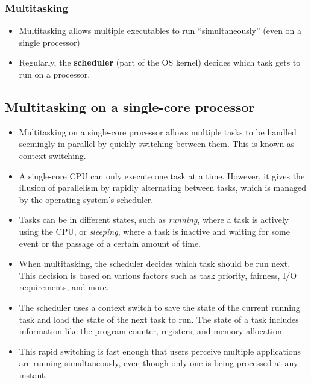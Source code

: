 \documentclass[12pt]{article}
\begin{document}
\subsubsection{Multitasking}

\begin{itemize}
    \item Multitasking allows multiple executables to run “simultaneously” (even on a single processor)
    \item Regularly, the \textbf{scheduler} (part of the OS kernel) decides which task gets to run on a processor.
\end{itemize}

\subsection{Multitasking on a single-core processor}

\begin{itemize}
    \item Multitasking on a single-core processor allows multiple tasks to be handled seemingly in parallel by quickly switching between them. This is known as context switching.
    \item A single-core CPU can only execute one task at a time. However, it gives the illusion of parallelism by rapidly alternating between tasks, which is managed by the operating system's scheduler.
    \item Tasks can be in different states, such as \textit{running}, where a task is actively using the CPU, or \textit{sleeping}, where a task is inactive and waiting for some event or the passage of a certain amount of time.
    \item When multitasking, the scheduler decides which task should be run next. This decision is based on various factors such as task priority, fairness, I/O requirements, and more.
    \item The scheduler uses a context switch to save the state of the current running task and load the state of the next task to run. The state of a task includes information like the program counter, registers, and memory allocation.
    \item This rapid switching is fast enough that users perceive multiple applications are running simultaneously, even though only one is being processed at any instant.
\end{itemize}
\end{document}
